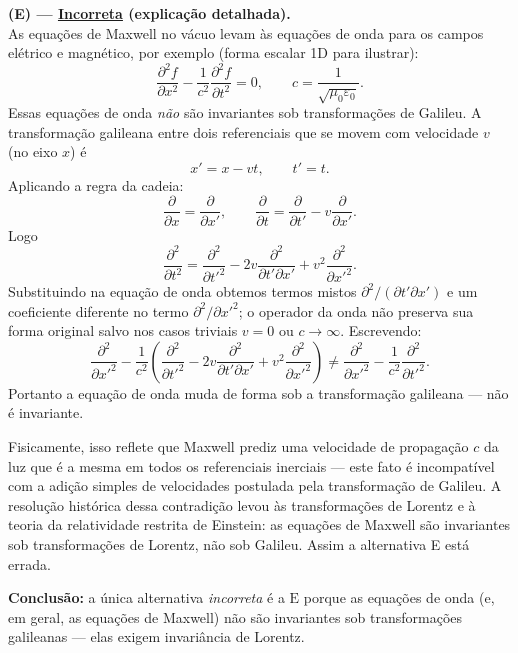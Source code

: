 \documentclass[a4paper,12pt]{article}
\begin{document}
\begin{flushleft}
\medskip

\textbf{(E) --- \underline{Incorreta} (explicação detalhada).}\\
As equações de Maxwell no vácuo levam às equações de onda para os campos elétrico e magnético, por exemplo (forma escalar 1D para ilustrar):
\[
\frac{\partial^2 f}{\partial x^2}-\frac{1}{c^2}\frac{\partial^2 f}{\partial t^2}=0,
\qquad c=\frac{1}{\sqrt{\mu_0\varepsilon_0}}.
\]
Essas equações de onda \emph{não} são invariantes sob transformações de Galileu. A transformação galileana entre dois referenciais que se movem com velocidade \(v\) (no eixo \(x\)) é
\[
x'=x-vt,\qquad t'=t.
\]
Aplicando a regra da cadeia:
\[
\frac{\partial}{\partial x}=\frac{\partial}{\partial x'},\qquad
\frac{\partial}{\partial t}=\frac{\partial}{\partial t'}-v\frac{\partial}{\partial x'}.
\]
Logo
\[
\frac{\partial^2}{\partial t^2}
=\frac{\partial^2}{\partial t'^2}-2v\frac{\partial^2}{\partial t'\partial x'}+v^2\frac{\partial^2}{\partial x'^2}.
\]
Substituindo na equação de onda obtemos termos mistos \(\partial^2/(\partial t'\partial x')\) e um coeficiente diferente no termo \(\partial^2/\partial x'^2\); o operador da onda não preserva sua forma original salvo nos casos triviais \(v=0\) ou \(c\to\infty\). Escrevendo:
\[
\frac{\partial^2}{\partial x'^2}-\frac{1}{c^2}\left(\frac{\partial^2}{\partial t'^2}-2v\frac{\partial^2}{\partial t'\partial x'}+v^2\frac{\partial^2}{\partial x'^2}\right)
\neq
\frac{\partial^2}{\partial x'^2}-\frac{1}{c^2}\frac{\partial^2}{\partial t'^2}.
\]
Portanto a equação de onda muda de forma sob a transformação galileana — não é invariante.

Fisicamente, isso reflete que Maxwell prediz uma velocidade de propagação \(c\) da luz que é a mesma em todos os referenciais inerciais — este fato é incompatível com a adição simples de velocidades postulada pela transformação de Galileu. A resolução histórica dessa contradição levou às transformações de Lorentz e à teoria da relatividade restrita de Einstein: as equações de Maxwell são invariantes sob transformações de Lorentz, não sob Galileu. Assim a alternativa E está errada.

\bigskip

\textbf{Conclusão:} a única alternativa \emph{incorreta} é a \(\boxed{\text{E}}\) porque as equações de onda (e, em geral, as equações de Maxwell) não são invariantes sob transformações galileanas — elas exigem invariância de Lorentz.
\end{flushleft}
\end{document}

